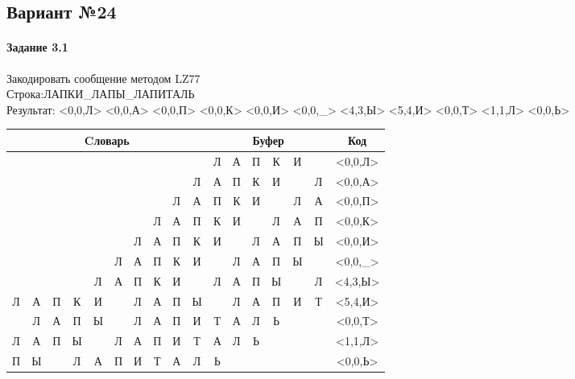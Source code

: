 \documentclass[a4paper, 12pt]{article}
\begin{document}
\pagebreak
\subsection{Вариант №24}
\paragraph{Задание 3.1}

Закодировать сообщение методом LZ77\\
Строка:ЛАПКИ\_ЛАПЫ\_ЛАПИТАЛЬ\\
Результат: <0,0,Л> <0,0,А> <0,0,П> <0,0,К> <0,0,И> <0,0,\_> <4,3,Ы> <5,4,И> <0,0,Т> <1,1,Л> <0,0,Ь>\\
\begin{table}[h!]
\centering
\begin{tabular}{|c|c|c|c|c|c|c|c|c|c|c|c|c|c|c|c|c|} 
\hline
\multicolumn{10}{|c|}{Cловарь} & \multicolumn{6}{c|}{Буфер} & Код  \\ \hline
  &   &   &   &   &   &   &   &   &   & \cellcolor[HTML]{8CE4F6} Л & А & П & К & И &   & <0,0,Л>
\\ \hline
  &   &   &   &   &   &   &   &   & Л & \cellcolor[HTML]{8CE4F6} А & П & К & И &   & Л & <0,0,А>
\\ \hline
  &   &   &   &   &   &   &   & Л & А & \cellcolor[HTML]{8CE4F6} П & К & И &   & Л & А & <0,0,П>
\\ \hline
  &   &   &   &   &   &   & Л & А & П & \cellcolor[HTML]{8CE4F6} К & И &   & Л & А & П & <0,0,К>
\\ \hline
  &   &   &   &   &   & Л & А & П & К & \cellcolor[HTML]{8CE4F6} И &   & Л & А & П & Ы & <0,0,И>
\\ \hline
  &   &   &   &   & Л & А & П & К & И & \cellcolor[HTML]{8CE4F6}   & Л & А & П & Ы &   & <0,0,\_>
\\ \hline
  &   &   &   & \cellcolor[HTML]{FFFF00} Л & \cellcolor[HTML]{FFFF00} А & \cellcolor[HTML]{FFFF00} П & К & И &   & \cellcolor[HTML]{FFFF00} Л & \cellcolor[HTML]{FFFF00} А & \cellcolor[HTML]{FFFF00} П & \cellcolor[HTML]{8CE4F6} Ы &   & Л & <4,3,Ы>
\\ \hline
Л & А & П & К & И & \cellcolor[HTML]{FFFF00}   & \cellcolor[HTML]{FFFF00} Л & \cellcolor[HTML]{FFFF00} А & \cellcolor[HTML]{FFFF00} П & Ы & \cellcolor[HTML]{FFFF00}   & \cellcolor[HTML]{FFFF00} Л & \cellcolor[HTML]{FFFF00} А & \cellcolor[HTML]{FFFF00} П & \cellcolor[HTML]{8CE4F6} И & Т & <5,4,И>
\\ \hline
  & Л & А & П & Ы &   & Л & А & П & И & \cellcolor[HTML]{8CE4F6} Т & А & Л & Ь &   &   & <0,0,Т>
\\ \hline
Л & \cellcolor[HTML]{FFFF00} А & П & Ы &   & Л & А & П & И & Т & \cellcolor[HTML]{FFFF00} А & \cellcolor[HTML]{8CE4F6} Л & Ь &   &   &   & <1,1,Л>
\\ \hline
П & Ы &   & Л & А & П & И & Т & А & Л & \cellcolor[HTML]{8CE4F6} Ь &   &   &   &   &   & <0,0,Ь>
\\ \hline
\end{tabular}
\end{table}
\end{document}

